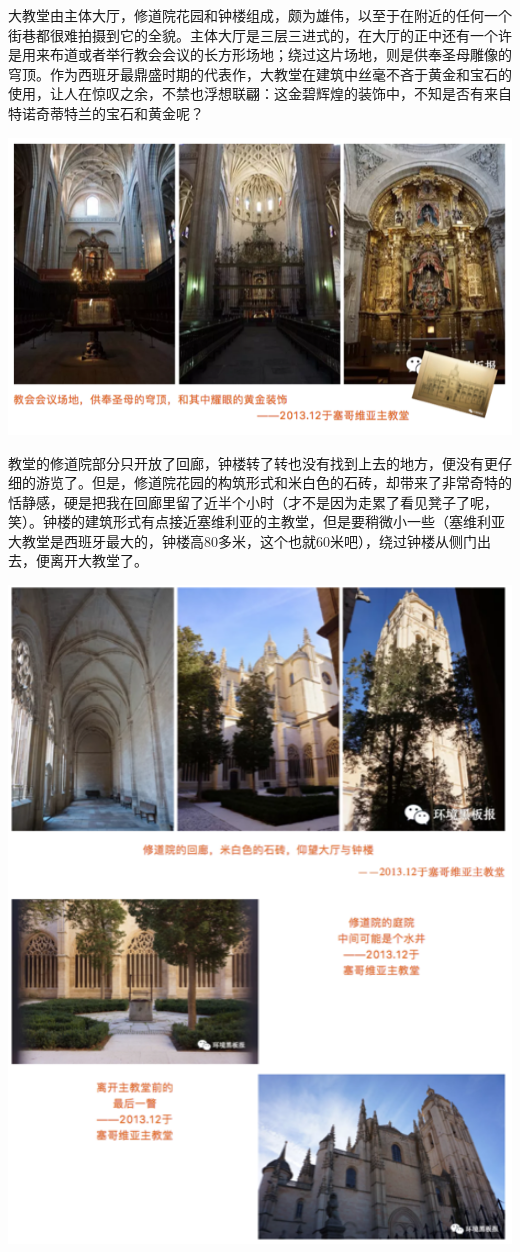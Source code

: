 \documentclass[
]{book}
\begin{document}
大教堂由主体大厅，修道院花园和钟楼组成，颇为雄伟，以至于在附近的任何一个街巷都很难拍摄到它的全貌。主体大厅是三层三进式的，在大厅的正中还有一个许是用来布道或者举行教会会议的长方形场地；绕过这片场地，则是供奉圣母雕像的穹顶。作为西班牙最鼎盛时期的代表作，大教堂在建筑中丝毫不吝于黄金和宝石的使用，让人在惊叹之余，不禁也浮想联翩：这金碧辉煌的装饰中，不知是否有来自特诺奇蒂特兰的宝石和黄金呢？

\includegraphics[width=8.33in]{images/xt51}

教堂的修道院部分只开放了回廊，钟楼转了转也没有找到上去的地方，便没有更仔细的游览了。但是，修道院花园的构筑形式和米白色的石砖，却带来了非常奇特的恬静感，硬是把我在回廊里留了近半个小时（才不是因为走累了看见凳子了呢，笑）。钟楼的建筑形式有点接近塞维利亚的主教堂，但是要稍微小一些（塞维利亚大教堂是西班牙最大的，钟楼高80多米，这个也就60米吧），绕过钟楼从侧门出去，便离开大教堂了。

\includegraphics[width=6.38in]{images/xt52}
\end{document}
